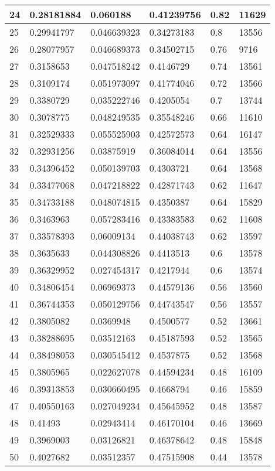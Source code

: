 \begin{longtable}{|l|l|l|l|l|l|}
24 & 0.28181884 & 0.060188 & 0.41239756 & 0.82 & 11629 \\ \hline 
25 & 0.29941797 & 0.046639323 & 0.34273183 & 0.8 & 13556 \\ \hline 
26 & 0.28077957 & 0.046689373 & 0.34502715 & 0.76 & 9716 \\ \hline 
27 & 0.3158653 & 0.047518242 & 0.4146729 & 0.74 & 13561 \\ \hline 
28 & 0.3109174 & 0.051973097 & 0.41774046 & 0.72 & 13566 \\ \hline 
29 & 0.3380729 & 0.035222746 & 0.4205054 & 0.7 & 13744 \\ \hline 
30 & 0.3078775 & 0.048249535 & 0.35548246 & 0.66 & 11610 \\ \hline 
31 & 0.32529333 & 0.055525903 & 0.42572573 & 0.64 & 16147 \\ \hline 
32 & 0.32931256 & 0.03875919 & 0.36084014 & 0.64 & 13556 \\ \hline 
33 & 0.34396452 & 0.050139703 & 0.4303721 & 0.64 & 13568 \\ \hline 
34 & 0.33477068 & 0.047218822 & 0.42871743 & 0.62 & 11647 \\ \hline 
35 & 0.34733188 & 0.048074815 & 0.4350387 & 0.64 & 15829 \\ \hline 
36 & 0.3463963 & 0.057283416 & 0.43383583 & 0.62 & 11608 \\ \hline 
37 & 0.33578393 & 0.06009134 & 0.44038743 & 0.62 & 13597 \\ \hline 
38 & 0.3635633 & 0.044308826 & 0.4413513 & 0.6 & 13578 \\ \hline 
39 & 0.36329952 & 0.027454317 & 0.4217944 & 0.6 & 13574 \\ \hline 
40 & 0.34806454 & 0.06969373 & 0.44579136 & 0.56 & 13560 \\ \hline 
41 & 0.36744353 & 0.050129756 & 0.44743547 & 0.56 & 13557 \\ \hline 
42 & 0.3805082 & 0.0369948 & 0.4500577 & 0.52 & 13661 \\ \hline 
43 & 0.38288695 & 0.03512163 & 0.45187593 & 0.52 & 13565 \\ \hline 
44 & 0.38498053 & 0.030545412 & 0.4537875 & 0.52 & 13568 \\ \hline 
45 & 0.3805965 & 0.022627078 & 0.44594234 & 0.48 & 16109 \\ \hline 
46 & 0.39313853 & 0.030660495 & 0.4668794 & 0.46 & 15859 \\ \hline 
47 & 0.40550163 & 0.027049234 & 0.45645952 & 0.48 & 13587 \\ \hline 
48 & 0.41493 & 0.02943414 & 0.46170104 & 0.46 & 13669 \\ \hline 
49 & 0.3969003 & 0.03126821 & 0.46378642 & 0.48 & 15848 \\ \hline 
50 & 0.4027682 & 0.03512357 & 0.47515908 & 0.44 & 13578 \\ \hline 
\end{longtable}